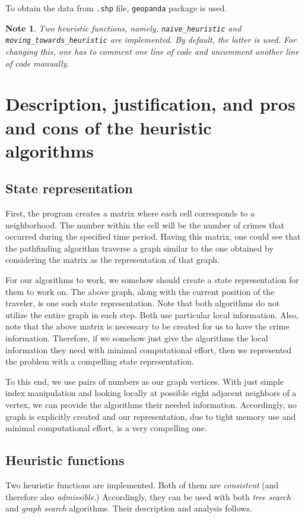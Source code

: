 \documentclass[11pt]{article}
\newtheorem*{note}{Note}
\begin{document}
			To obtain the data from \texttt{.shp} file, \texttt{geopanda} package is used.
			
			\begin{note}
				Two heuristic functions, namely, \texttt{naive\_heuristic} and \texttt{moving\_towards\_heuristic} are implemented. By default, the latter is used. For changing this, one has to comment one
				line of code and uncomment another line of code manually.
			\end{note}
	
	\section{Description, justification, and pros and cons of the heuristic algorithms }
		\subsection{State representation}
			First, the program creates a matrix where each cell corresponds to a neighborhood. The number within the cell will be the number of crimes that occurred during the specified time period. Having this matrix, one could see that the pathfinding algorithm traverse a graph similar to the one obtained by considering the matrix as the representation of that graph.
			
			For our algorithms to work, we somehow should create a state representation for them to work on. The above graph, along with the current position of the traveler, is one such state representation. Note that both algorithms do not utilize the entire graph in each step. Both use particular local information. Also, note that the above matrix is necessary to be created for us to have the crime information. Therefore, if we somehow just give the algorithms the local information they need with minimal computational effort, then we represented the problem with a compelling state representation.
			
				To this end, we use pairs of numbers as our graph vertices. With just simple index manipulation and looking locally at possible eight adjacent neighbors of a vertex, we can provide the algorithms their needed information. Accordingly, no graph is explicitly created and our representation, due to tight memory use and minimal computational effort, is a very compelling one.
		\subsection{Heuristic functions}
			Two heuristic functions are implemented. Both of them are \emph{consistent} (and therefore also \emph{admissible}.) Accordingly, they can be used with both \emph{tree search} and \emph{graph search} algorithms. Their description and analysis follows.
			
\end{document}
